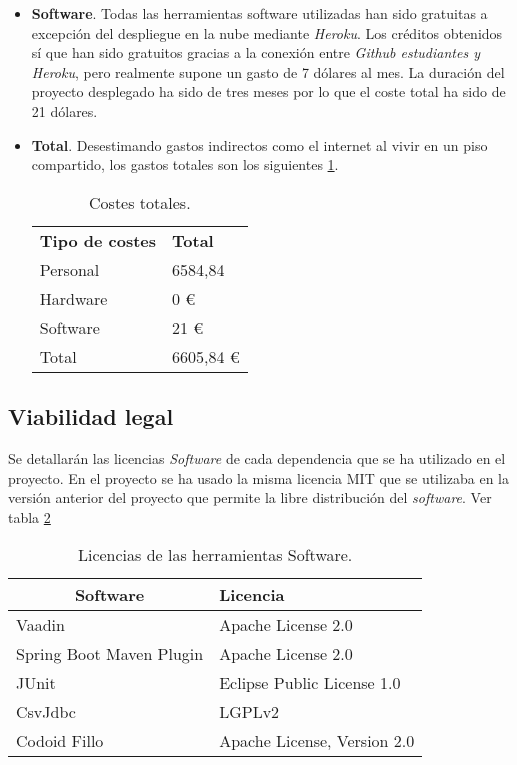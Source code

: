 \begin{itemize}
\item \textbf{Software}.
Todas las herramientas software utilizadas han sido gratuitas a excepción del despliegue en la nube mediante \emph{Heroku}. Los créditos obtenidos sí que han sido gratuitos gracias a la conexión entre \emph{Github estudiantes y Heroku}, pero realmente supone un gasto de 7 dólares al mes.
La duración del proyecto desplegado ha sido de tres meses por lo que el coste total ha sido de 21 dólares.

 
\item \textbf{Total}.
Desestimando gastos indirectos como el internet al vivir en un piso compartido, los gastos totales son los siguientes \ref{Costes totales}.

\begin{table}[]
	\label{Costes totales}
	\centering
	\begin{tabular}{|l|l|}
		\hline
		\multicolumn{1}{|c|}{\textbf{Tipo de costes}}     & \textbf{Total} \\
		Personal &  6584,84\\ 
		Hardware & 0 € \\
		Software & 21 € \\	\hline
		Total & 6605,84 € \\\hline
	\end{tabular}
	\caption{Costes totales.}
\end{table}

\end{itemize}

\subsection{Viabilidad legal}
Se detallarán las licencias \emph{Software} de cada dependencia que se ha utilizado en el proyecto. En el proyecto se ha usado la misma licencia MIT que se utilizaba en la versión anterior del proyecto que permite la libre distribución del \emph{software}. Ver tabla \ref{Dependencias del proyecto}

\begin{table}[]
	\label{Dependencias del proyecto}
	\centering
	\begin{tabular}{|l|l|}
		\hline
		\multicolumn{1}{|c|}{\textbf{Software}}     & \textbf{Licencia} \\ \hline
		Vaadin & Apache License 2.0 \\ \hline
		Spring Boot Maven Plugin & Apache License 2.0 \\ \hline
		JUnit & Eclipse Public License 1.0 \\	\hline
		CsvJdbc & LGPLv2 \\ \hline
		Codoid Fillo & Apache License, Version 2.0 \\ \hline
	\end{tabular}
	\caption{Licencias de las herramientas Software.}
\end{table}

